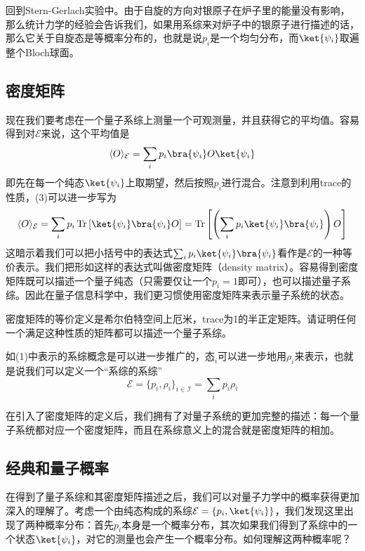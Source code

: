 回到Stern-Gerlach实验中。由于自旋的方向对银原子在炉子里的能量没有影响，那么统计力学的经验会告诉我们，如果用系综来对炉子中的银原子进行描述的话，那么它关于自旋态是等概率分布的，也就是说$p_i$是一个均匀分布，而$\ket{\psi_i}$取遍整个Bloch球面。

\subsection{密度矩阵}

现在我们要考虑在一个量子系综上测量一个可观测量，并且获得它的平均值。容易得到对$\mathcal{E}$来说，这个平均值是\begin{equation}
\langle O\rangle_\mathcal{E}=\sum_i p_i\bra{\psi_i}O\ket{\psi_i}
\end{equation}
即先在每一个纯态$\ket{\psi_i}$上取期望，然后按照$p_i$进行混合。注意到利用trace的性质，(3)可以进一步写为
\begin{equation}
\langle O\rangle_\mathcal{E}=\sum_i p_i\operatorname{Tr}\left[\ket{\psi_i}\bra{\psi_i}O\right]=\operatorname{Tr}\left[\left(\sum_i p_i\ket{\psi_i}\bra{\psi_i}\right)O\right]
\end{equation}
这暗示着我们可以把小括号中的表达式$\sum_i p_i\ket{\psi_i}\bra{\psi_i}$看作是$\mathcal{E}$的一种等价表示。我们把形如这样的表达式叫做密度矩阵（density matrix）。容易得到密度矩阵既可以描述一个量子纯态（只需要仅让一个$p_i=1$即可），也可以描述量子系综。因此在量子信息科学中，我们更习惯使用密度矩阵来表示量子系统的状态。\begin{exercise}{}
密度矩阵的等价定义是希尔伯特空间上厄米，trace为1的半正定矩阵。请证明任何一个满足这种性质的矩阵都可以描述一个量子系综。
\end{exercise}

如(1)中表示的系综概念是可以进一步推广的，$\text{态}_i$可以进一步地用$\rho_i$来表示，也就是说我们可以定义一个“系综的系综” $$\mathcal{E}=\{p_i,\rho_i\}_{i\in\mathcal{I}}=\sum_i p_i\rho_i$$

在引入了密度矩阵的定义后，我们拥有了对量子系统的更加完整的描述：每一个量子系统都对应一个密度矩阵，而且在系综意义上的混合就是密度矩阵的相加。

\subsection{经典和量子概率}

在得到了量子系综和其密度矩阵描述之后，我们可以对量子力学中的概率获得更加深入的理解了。考虑一个由纯态构成的系综$\mathcal{E}=\{p_i,\ket{\psi_i}\}$，我们发现这里出现了两种概率分布：首先$p_i$本身是一个概率分布，其次如果我们得到了系综中的一个状态$\ket{\psi_i}$，对它的测量也会产生一个概率分布。如何理解这两种概率呢？

